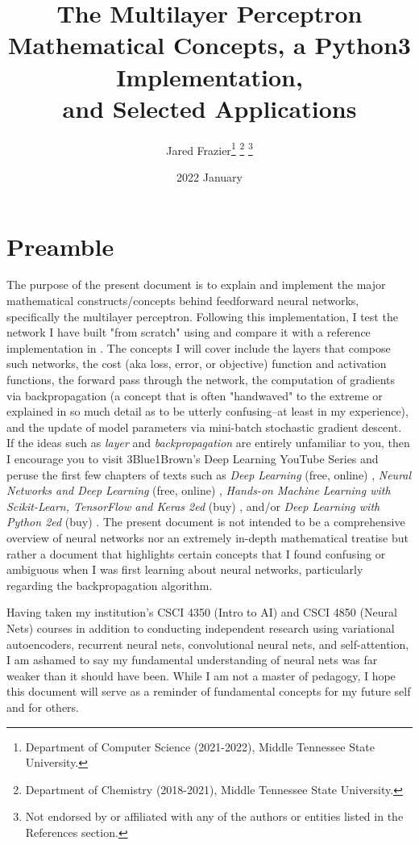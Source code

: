 \documentclass{article}
\title{
	The Multilayer Perceptron \\ 
	\large Mathematical Concepts, a Python3 Implementation, \\ and Selected Applications}
\date{2022 January}
\author{Jared Frazier\thanks{Department of Computer Science (2021-2022),
Middle Tennessee State University.} \thanks{Department of Chemistry (2018-2021),
Middle Tennessee State University.} \thanks{Not endorsed by or affiliated with any of the 
authors or entities listed in the References section.}}
\begin{document}
\maketitle
\titlepage

\tableofcontents
\pagebreak

\section{Preamble}

The purpose of the present document is to explain and implement the major mathematical
constructs/concepts behind feedforward neural networks, specifically the multilayer perceptron.
Following this implementation, I test the network I have built "from scratch" using
 and compare it with a reference implementation in .
The concepts I will cover include the layers that compose such networks,
the cost (aka loss, error, or objective) function and activation functions,
the forward pass through the network,
the computation of gradients via backpropagation (a concept that is often
"handwaved" to the extreme
or explained in so much detail as to be utterly confusing--at least in my experience),
and the update of model parameters via mini-batch stochastic gradient descent.
If the ideas such as \textit{layer} and \textit{backpropagation} are entirely unfamiliar
to you, then I encourage you to visit 3Blue1Brown's Deep Learning YouTube Series \cite{3Blue1BrownWhatIsANN2017}
and peruse the first few chapters of texts such as \textit{Deep Learning} (free, online) \cite{Goodfellow2016},
\textit{Neural Networks and Deep Learning} (free, online) \cite{Nielsen2015},
\textit{Hands-on Machine Learning with Scikit-Learn, TensorFlow and Keras 2ed} (buy) \cite{Geron2020},
and/or \textit{Deep Learning with Python 2ed} (buy) \cite{Chollet2021}. The present document
is not intended to be a comprehensive overview of neural networks nor an extremely
in-depth mathematical treatise but rather a document that highlights certain concepts that
I found confusing or ambiguous when I was first learning about neural networks,
particularly regarding the backpropagation algorithm.

Having taken my institution's CSCI 4350 (Intro to AI) and CSCI 4850 (Neural Nets)
courses in addition to conducting independent research using
variational autoencoders, recurrent neural nets, convolutional neural nets, and
self-attention, I am ashamed to say my fundamental understanding of neural nets
was far weaker than it should have been. While I am not a master of pedagogy,
I hope this document will serve as a reminder of fundamental concepts for my
future self and for others.
\end{document}
